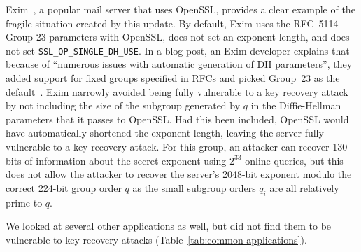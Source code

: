 Exim~\cite{exim}, a popular mail server that uses OpenSSL, provides a clear
example of the fragile situation created by this update. By default, Exim uses
the RFC~5114 Group 23 parameters with OpenSSL, does not set an exponent length,
and does not set \texttt{SSL\_OP\_SINGLE\-\_DH\_USE}. In a blog post, an Exim
developer explains that because of ``numerous issues with automatic generation
of DH parameters'', they added support for fixed groups specified in RFCs and picked
Group~23 as the default~\cite{exim-blog}.  Exim narrowly avoided being fully
vulnerable to a key recovery attack by not including the size of the subgroup
generated by $q$ in the Diffie-Hellman parameters that it passes to OpenSSL.
Had this been included, OpenSSL would have automatically shortened the exponent
length, leaving the server fully vulnerable to a key recovery attack.  For this
group, an attacker can recover 130 bits of information about the secret
exponent using $2^{33}$ online queries, but this does not allow the attacker to
recover the server's 2048-bit exponent modulo the correct 224-bit group order
$q$ as the small subgroup orders $q_i$ are all relatively prime to $q$.

We looked at several other applications as well, but did not find them to be
vulnerable to key recovery attacks (Table~\ref{tab:common-applications}).




